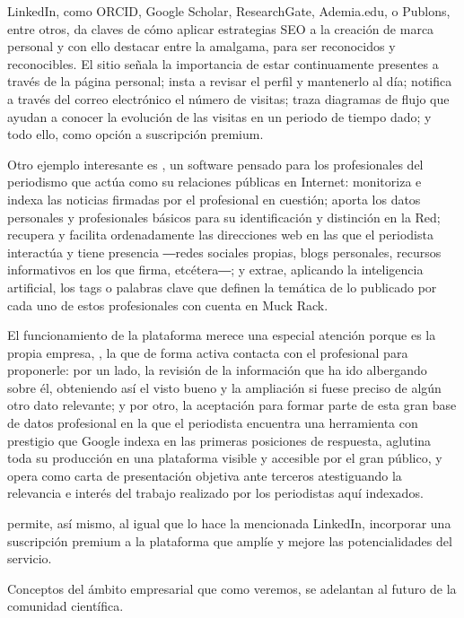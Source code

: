 \documentclass{textolivre}
\begin{document}
LinkedIn, como ORCID, Google Scholar, ResearchGate, Ademia.edu, o Publons, entre otros, da claves de cómo aplicar estrategias SEO a la creación de marca personal y con ello destacar entre la amalgama, para ser reconocidos y reconocibles. El sitio señala la importancia de estar continuamente presentes a través de la página personal; insta a revisar el perfil y mantenerlo al día; notifica a través del correo electrónico el número de visitas; traza diagramas de flujo que ayudan a conocer la evolución de las visitas en un periodo de tiempo dado; y todo ello, como opción a suscripción premium.

Otro ejemplo interesante es \textcite{noauthor_muck_nodate}, un software pensado para los profesionales del periodismo que actúa como su relaciones públicas en Internet: monitoriza e indexa las noticias firmadas por el profesional en cuestión; aporta los datos personales y profesionales básicos para su identificación y distinción en la Red; recupera y facilita ordenadamente las direcciones web en las que el periodista interactúa y tiene presencia ―redes sociales propias, blogs personales, recursos informativos en los que firma, etcétera―; y extrae, aplicando la inteligencia artificial, los tags o palabras clave que definen la temática de lo publicado por cada uno de estos profesionales con cuenta en Muck Rack.

El funcionamiento de la plataforma merece una especial atención porque es la propia empresa, \textcite{noauthor_muck_nodate}, la que de forma activa contacta con el profesional para proponerle: por un lado, la revisión de la información que ha ido albergando sobre él, obteniendo así el visto bueno y la ampliación si fuese preciso de algún otro dato relevante; y por otro, la aceptación para formar parte de esta gran base de datos profesional en la que el periodista encuentra una herramienta con prestigio que Google indexa en las primeras posiciones de respuesta, aglutina toda su producción en una plataforma visible y accesible por el gran público, y opera como carta de presentación objetiva ante terceros atestiguando la relevancia e interés del trabajo realizado por los periodistas aquí indexados.

\textcite{noauthor_muck_nodate} permite, así mismo, al igual que lo hace la mencionada LinkedIn, incorporar una suscripción premium a la plataforma que amplíe y mejore las potencialidades del servicio.

Conceptos del ámbito empresarial que como veremos, se adelantan al futuro de la comunidad científica.
\end{document}
